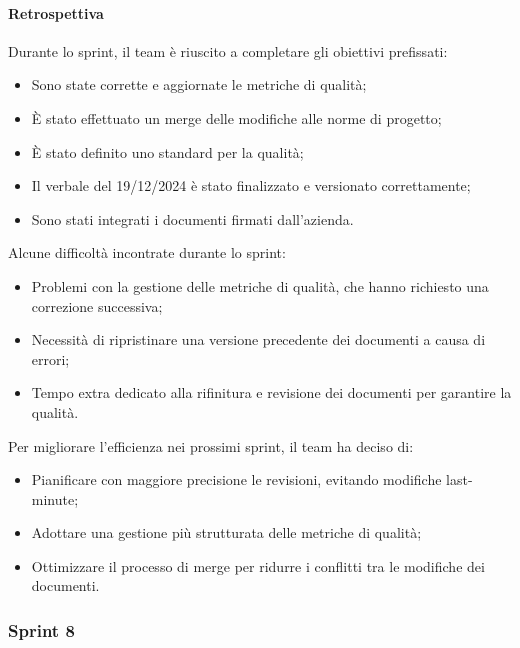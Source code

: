 \documentclass{article}
\begin{document}
                \paragraph{Retrospettiva}
                Durante lo sprint, il team è riuscito a completare gli obiettivi prefissati:
                \begin{itemize}
                    \item Sono state corrette e aggiornate le metriche di qualità;
                    \item È stato effettuato un merge delle modifiche alle norme di progetto;
                    \item È stato definito uno standard per la qualità;
                    \item Il verbale del 19/12/2024 è stato finalizzato e versionato correttamente;
                    \item Sono stati integrati i documenti firmati dall'azienda.
                \end{itemize}
                
                Alcune difficoltà incontrate durante lo sprint:
                \begin{itemize}
                    \item Problemi con la gestione delle metriche di qualità, che hanno richiesto una correzione successiva;
                    \item Necessità di ripristinare una versione precedente dei documenti a causa di errori;
                    \item Tempo extra dedicato alla rifinitura e revisione dei documenti per garantire la qualità.
                \end{itemize}
                
                Per migliorare l'efficienza nei prossimi sprint, il team ha deciso di:
                \begin{itemize}
                    \item Pianificare con maggiore precisione le revisioni, evitando modifiche last-minute;
                    \item Adottare una gestione più strutturata delle metriche di qualità;
                    \item Ottimizzare il processo di merge per ridurre i conflitti tra le modifiche dei documenti.
                \end{itemize}
            \subsubsection{Sprint 8}
\end{document}

